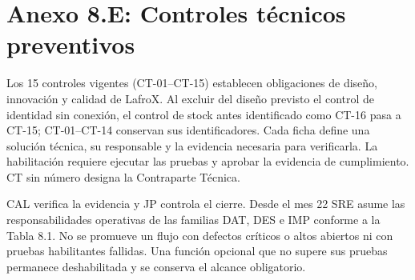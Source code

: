 \clearpage
\section{Anexo 8.E: Controles técnicos preventivos}
Los 15 controles vigentes (CT-01--CT-15) establecen obligaciones de diseño, innovación y calidad de LafroX. Al excluir del diseño previsto el control de identidad sin conexión, el control de stock antes identificado como CT-16 pasa a CT-15; CT-01--CT-14 conservan sus identificadores. Cada ficha define una solución técnica, su responsable y la evidencia necesaria para verificarla. La habilitación requiere ejecutar las pruebas y aprobar la evidencia de cumplimiento. CT sin número designa la Contraparte Técnica.

CAL verifica la evidencia y JP controla el cierre. Desde el mes 22 SRE asume las responsabilidades operativas de las familias DAT, DES e IMP conforme a la Tabla 8.1. No se promueve un flujo con defectos críticos o altos abiertos ni con pruebas habilitantes fallidas. Una función opcional que no supere sus pruebas permanece deshabilitada y se conserva el alcance obligatorio.


